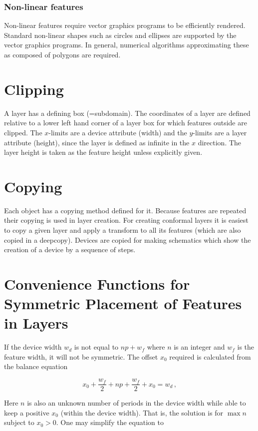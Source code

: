 \documentclass{article}
\begin{document}
\subsubsection{Non-linear features}
Non-linear features require vector graphics programs to be efficiently rendered. Standard non-linear shapes such as circles and ellipses are supported by the vector graphics programs. In general, numerical algorithms approximating these as composed of polygons are required. 

\section{Clipping}
A layer has a defining box (=subdomain). The coordinates of a layer are defined relative to a lower left hand corner of a layer box for which features outside are clipped. The $x$-limits are a device attribute (width) and the $y$-limits are a layer attribute (height), since the layer is defined as infinite in the $x$ direction. The layer height is taken as the feature height unless explicitly given.

\section{Copying} 
Each object has a copying method defined for it. Because features are repeated their copying is used in layer creation. For creating conformal layers it is easiest to copy a given layer and apply a transform to all its features (which are also copied in a deepcopy). Devices are copied for making schematics which show the creation of a device by a sequence of steps.

\section{Convenience Functions for Symmetric Placement of Features in Layers}

If the device width $w_d$ is not equal to $np + w_f$ where $n$ is an integer and $w_f$ is the feature width, it will not be symmetric. The offset $x_0$ required is calculated from the balance equation

$$x_0 + \frac{w_f}{2} + np + \frac{w_f}{2} + x_0 = w_d\,, $$

Here $n$ is also an unknown number of periods in the device width while able to keep a positive $x_0$ (within the device width). That is, the solution is for $\max n$ subject to $x_0 > 0$. One may simplify the equation to 
\end{document}
